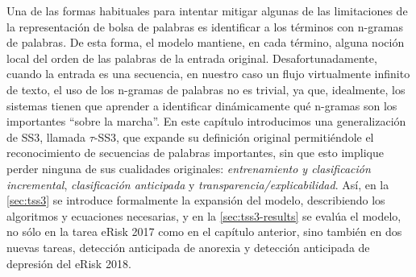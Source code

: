 Una de las formas habituales para intentar mitigar algunas de las limitaciones de la representación de bolsa de palabras es identificar a los términos con n-gramas de palabras. De esta forma, el modelo mantiene, en cada término, alguna noción local del orden de las palabras de la entrada original.
Desafortunadamente, cuando la entrada es una secuencia, en nuestro caso un flujo virtualmente infinito de texto, el uso de los n-gramas de palabras no es trivial, ya que, idealmente, los sistemas tienen que aprender a identificar dinámicamente qué n-gramas son los importantes ``sobre la marcha''.
En este capítulo introducimos una generalización de SS3, llamada $\tau$-SS3, que expande su definición original permitiéndole el reconocimiento de secuencias de palabras importantes, sin que esto implique perder ninguna de sus cualidades originales: \emph{
entrenamiento y clasificación incremental}, \emph{clasificación anticipada} y \emph{transparencia/explicabilidad}.
Así, en la \autoref{sec:tss3} se introduce formalmente la expansión del modelo, describiendo los algoritmos y ecuaciones necesarias, y en la \autoref{sec:tss3-results} se evalúa el modelo, no sólo en la tarea eRisk 2017 como en el capítulo anterior, sino también en dos nuevas tareas, detección anticipada de anorexia y detección anticipada de depresión del eRisk 2018.

